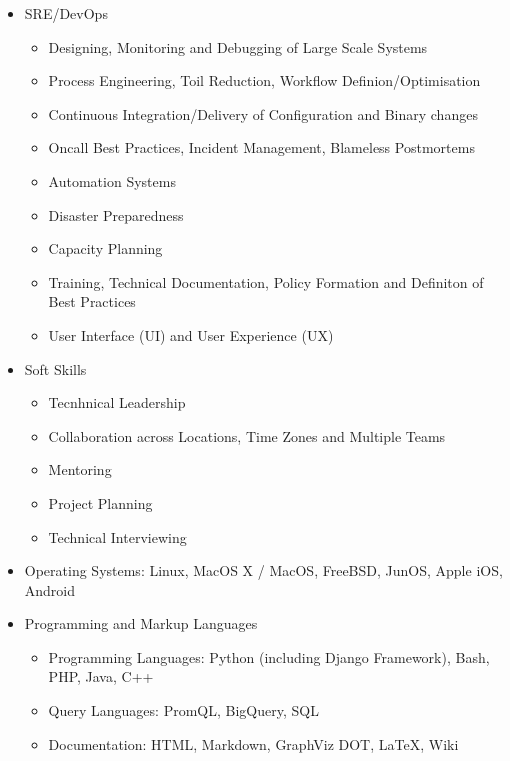 \documentclass[a4paper, 11pt] {article}
\begin{document}
\begin{itemize}
\item SRE/DevOps
  \begin{itemize}
  \item Designing, Monitoring and Debugging of Large Scale Systems
  \item Process Engineering, Toil Reduction, Workflow Definion/Optimisation
  \item Continuous Integration/Delivery of Configuration and Binary changes
  \item Oncall Best Practices, Incident Management, Blameless Postmortems
  \item Automation Systems
  \item Disaster Preparedness
  \item Capacity Planning
  \item Training, Technical Documentation, Policy Formation and Definiton of Best Practices
  \item User Interface (UI) and User Experience (UX)
  \end{itemize}
\item Soft Skills
  \begin{itemize}
  \item Tecnhnical Leadership
  \item Collaboration across Locations, Time Zones and Multiple Teams
  \item Mentoring
  \item Project Planning
  \item Technical Interviewing
  \end{itemize}
  \item Operating Systems: Linux, MacOS X / MacOS, FreeBSD, JunOS, Apple iOS, Android
\item Programming and Markup Languages
  \begin{itemize}
  \item Programming Languages: Python (including Django Framework), Bash, PHP, Java, C++
  \item Query Languages: PromQL, BigQuery, SQL
  \item Documentation: HTML, Markdown, GraphViz DOT, LaTeX, Wiki
  \end{itemize}
\end{itemize}  
\end{document}
